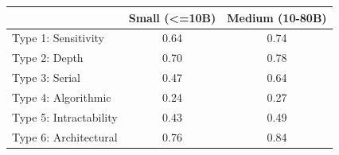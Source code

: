 \begin{tabular}{lcc}
\toprule
 & Small (<=10B) & Medium (10-80B) \\
\midrule
Type 1: Sensitivity & 0.64 & 0.74 \\
Type 2: Depth & 0.70 & 0.78 \\
Type 3: Serial & 0.47 & 0.64 \\
Type 4: Algorithmic & 0.24 & 0.27 \\
Type 5: Intractability & 0.43 & 0.49 \\
Type 6: Architectural & 0.76 & 0.84 \\
\bottomrule
\end{tabular}